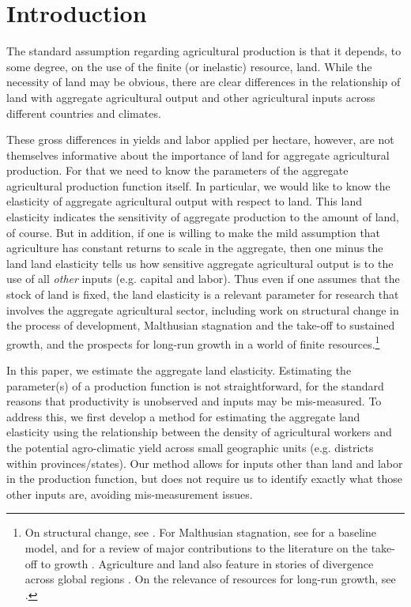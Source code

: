 \documentclass[11pt]{article}
\begin{document}
\pagebreak 

\section{Introduction}
\onehalfspacing 
The standard assumption regarding agricultural production is that it depends, to some degree, on the use of the finite (or inelastic) resource, land. While the necessity of land may be obvious, there are clear differences in the relationship of land with aggregate agricultural output and other agricultural inputs across different countries and climates. 

These gross differences in yields and labor applied per hectare, however, are not themselves informative about the importance of land for aggregate agricultural production. For that we need to know the parameters of the aggregate agricultural production function itself. In particular, we would like to know the elasticity of aggregate agricultural output with respect to land. This land elasticity indicates the sensitivity of aggregate production to the amount of land, of course. But in addition, if one is willing to make the mild assumption that agriculture has constant returns to scale in the aggregate, then one minus the land land elasticity tells us how sensitive aggregate agricultural output is to the use of all \textit{other} inputs (e.g. capital and labor). Thus even if one assumes that the stock of land is fixed, the land elasticity is a relevant parameter for research that involves the aggregate agricultural sector, including work on structural change in the process of development, Malthusian stagnation and the take-off to sustained growth, and the prospects for long-run growth in a world of finite resources.\footnote{On structural change, see \cite{Gollin:2007oq,Restuccia:2008hc,weilwilde2009,Gollin:2010ys,ev2016clim}. For Malthusian stagnation, see \cite{ashraf2010dynamics} for a baseline model, and \citet{Galor:2011uq} for a review of major contributions to the literature on the take-off to growth \citep{gw00,galor2002natural,Hansen:2002fk,doepke2004accounting,cs2005,lagerlof2006,craftsmills2009,strulik2008population}. Agriculture and land also feature in stories of divergence across global regions \citep{kp2001,galor2008trading,vollrath2011,vv08,vv13,cs2015}. On the relevance of resources for long-run growth, see \cite{perettovalente2015}.}

In this paper, we estimate the aggregate land elasticity. Estimating the parameter(s) of a  production function is not straightforward, for the standard reasons that productivity is unobserved and inputs may be mis-measured. To address this, we first develop a method for estimating the aggregate land elasticity using the relationship between the density of agricultural workers and the potential agro-climatic yield across small geographic units (e.g. districts within provinces/states). Our method allows for inputs other than land and labor in the production function, but does not require us to identify exactly what those other inputs are, avoiding mis-measurement issues. 
\end{document}
